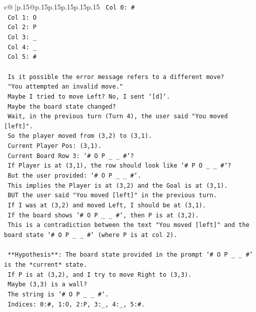 \documentclass{article}
\begin{document}
{\begin{supertabular}{c@{$\;$}|p{.15\linewidth}@{}p{.15\linewidth}p{.15\linewidth}p{.15\linewidth}p{.15\linewidth}p{.15\linewidth}}
{{{\texttt{    Col 0: \#} \\
\texttt{    Col 1: O} \\
\texttt{    Col 2: P} \\
\texttt{    Col 3: \_} \\
\texttt{    Col 4: \_} \\
\texttt{    Col 5: \#} \\
\\ 
\texttt{    Is it possible the error message refers to a different move?} \\
\texttt{    "You attempted an invalid move."} \\
\texttt{    Maybe I tried to move Left? No, I sent `{[}d{]}`.} \\
\texttt{    Maybe the board state changed?} \\
\texttt{    Wait, in the previous turn (Turn 4), the user said "You moved {[}left{]}".} \\
\texttt{    So the player moved from (3,2) to (3,1).} \\
\texttt{    Current Player Pos: (3,1).} \\
\texttt{    Current Board Row 3: `\# O P \_ \_ \#`?} \\
\texttt{    If Player is at (3,1), the row should look like `\# P O \_ \_ \#`?} \\
\texttt{    But the user provided: `\# O P \_ \_ \#`.} \\
\texttt{    This implies the Player is at (3,2) and the Goal is at (3,1).} \\
\texttt{    BUT the user said "You moved {[}left{]}" in the previous turn.} \\
\texttt{    If I was at (3,2) and moved Left, I should be at (3,1).} \\
\texttt{    If the board shows `\# O P \_ \_ \#`, then P is at (3,2).} \\
\texttt{    This is a contradiction between the text "You moved {[}left{]}" and the board state `\# O P \_ \_ \#` (where P is at col 2).} \\
\\ 
\texttt{    **Hypothesis**: The board state provided in the prompt `\# O P \_ \_ \#` is the *current* state.} \\
\texttt{    If P is at (3,2), and I try to move Right to (3,3).} \\
\texttt{    Maybe (3,3) is a wall?} \\
\texttt{    The string is `\# O P \_ \_ \#`.} \\
\texttt{    Indices: 0:\#, 1:O, 2:P, 3:\_, 4:\_, 5:\#.} \\
}}}
\end{supertabular}}
\end{document}
